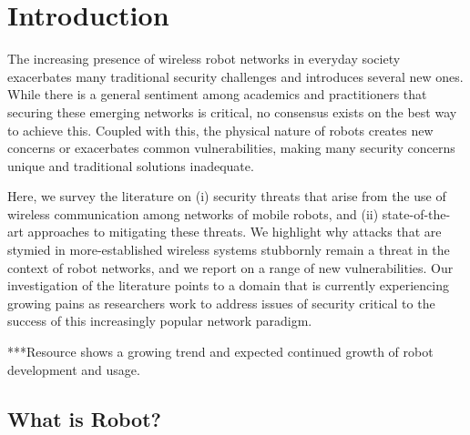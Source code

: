 \section{Introduction}

\medskip

The increasing presence of wireless robot networks in everyday society exacerbates many traditional security challenges and introduces several new ones. While there is a general sentiment among academics and practitioners that securing these emerging networks is critical, no consensus exists on the best way to achieve this. Coupled with this, the physical nature of robots creates new concerns or exacerbates common vulnerabilities, making many security concerns unique and traditional solutions inadequate.

Here, we survey the literature on (i) security threats that arise from the use of wireless communication among networks of mobile robots, and (ii) state-of-the-art approaches to mitigating these threats. We highlight why attacks that are stymied in more-established wireless systems stubbornly remain a threat in the context of robot networks, and we report on a range of new vulnerabilities.  Our investigation of the literature points to a domain that is currently experiencing growing pains as researchers work to address issues of security critical to the success of this increasingly popular network paradigm.





***Resource shows a growing trend and expected continued growth of robot development and usage.  


\subsection{What is Robot?}

